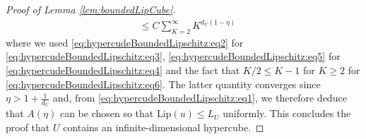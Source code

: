 \documentclass[10pt,a4paper]{amsart}
\begin{document}
\begin{proof}[Proof of Lemma \ref{lem:boundedLipCube}]
\begin{align}
&\leq C \sum_{K=2}^\infty K^{d_U(1-\eta)}\label{eq:hypercudeBoundedLipschitz:eq6}
\end{align}
where we used \eqref{eq:hypercudeBoundedLipschitz:eq2} for \eqref{eq:hypercudeBoundedLipschitz:eq3}, \eqref{eq:hypercudeBoundedLipschitz:eq5} for \eqref{eq:hypercudeBoundedLipschitz:eq4} and the fact that $K/2 \leq K-1$ for $K \geq 2$ for \eqref{eq:hypercudeBoundedLipschitz:eq6}. The latter quantity converges since $\eta > 1 + \frac{1}{d_U}$ and, from \eqref{eq:hypercudeBoundedLipschitz:eq1}, we therefore deduce that $A(\eta)$ can be chosen so that $\textrm{Lip}(u) \leq L_U$ uniformly. This concludes the proof that $U$ contains an infinite-dimensional hypercube.
\end{proof}
\end{document}
